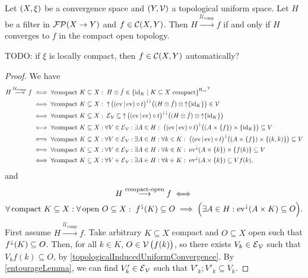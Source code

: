 \begin{proposition} \label{uniformConvergenceOnCompactsIsCompactOpenConvergence}
Let $\sSet{X, \xi}$ be a convergence space and $\sSet{Y, \mathcal{V}}$ a topological uniform space. Let $H$ be a filter in $\operatorname{\mathcal{FP}}(X\to Y)$ and $f\in \operatorname{\mathcal{C}}(X, Y)$. 
Then $H \overset{\mathcal{U}_\text{comp}}{\longrightarrow} f$ \textup{if and only if} $H$ converges to $f$ in the compact open topology.
\end{proposition}
TODO: if $\xi$ is locally compact, then $f\in \operatorname{\mathcal{C}}(X,Y)$ automatically?
\begin{proof}
We have
\begin{align*}
H \overset{\mathcal{U}_\text{comp}}{\longrightarrow} f &\iff \forall \text{compact $K\subseteq X$}:\; H\otimes \pfilter{f} \in \setbuilder{\id_K}{\text{$K\subseteq X$ compact}}^{\uRelEv^\transp} \\
&\iff \forall \text{compact $K\subseteq X$}:\; \upset\big((\evalMap | \evalMap)\circ t\big)^{\imf\imf}\big((H\otimes\pfilter{f})\otimes \upset\{\id_K\}\big) \in \mathcal{V} \\
&\iff \forall \text{compact $K\subseteq X$}:\; \entourage_\mathcal{V} \subseteq \upset\big((\evalMap | \evalMap)\circ t\big)^{\imf\imf}\big((H\otimes\pfilter{f})\otimes \upset\{\id_K\}\big) \\
&\iff \forall \text{compact $K\subseteq X$}: \forall V\in \entourage_{\mathcal{V}}: \exists A\in H: \; \big((\evalMap | \evalMap)\circ t\big)^{\imf}\big((A\times\{f\})\times \{\id_K\}\big) \subseteq V \\
&\iff \forall \text{compact $K\subseteq X$}: \forall V\in \entourage_{\mathcal{V}}: \exists A\in H: \forall k\in K: \; \big((\evalMap | \evalMap)\circ t\big)^{\imf}\big((A\times\{f\})\times \{(k,k)\}\big) \subseteq V \\
&\iff \forall \text{compact $K\subseteq X$}: \forall V\in \entourage_{\mathcal{V}}: \exists A\in H: \forall k\in K: \; \evalMap^\imf(A\times \{k\})\times \{f(k)\} \subseteq V \\
&\iff \forall \text{compact $K\subseteq X$}: \forall V\in \entourage_{\mathcal{V}}: \exists A\in H: \forall k\in K: \; \evalMap^\imf(A\times \{k\}) \subseteq Vf(k),
\end{align*}
and
\begin{multline*}
H \overset{\text{compact-open}}{\longrightarrow} f \iff \\
\forall \,\text{compact $K\subseteq X$}: \forall \,\text{open $O\subseteq X$}: \; f^\downarrow(K)\subseteq O \implies \Big(\exists A\in H: \operatorname{ev}^\downarrow(A\times K)\subseteq O\Big).
\end{multline*}
First assume $H \overset{\mathcal{U}_\text{comp}}{\longrightarrow} f$. Take arbitrary $K\subseteq X$ compact and $O\subseteq X$ open such that $f^\downarrow(K)\subseteq O$. Then, for all $k\in K$, $O\in \operatorname{\mathcal{V}}\big(f(k)\big)$, so there exists $V_k\in\operatorname{\mathcal{E}}_{\mathcal{V}}$ such that $V_kf(k)\subseteq O$, by \ref{topologicalInducedUniformConvergence}. By \ref{entourageLemma}, we can find $V'_k\in\operatorname{\mathcal{E}}_\mathcal{V}$ such that $V'_k;V'_k \subseteq V_k$.


\end{proof}
